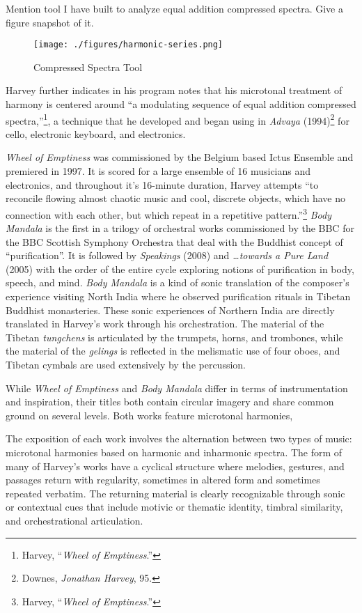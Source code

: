 Mention tool I have built to analyze equal addition compressed spectra. Give a figure snapshot of it.

\begin{figure}[htbp]
\centering
\texttt{[image: ./figures/harmonic-series.png]}
\caption{Compressed Spectra Tool}
\end{figure}

Harvey further indicates in his program notes that his microtonal treatment of harmony is centered around ``a modulating sequence of equal addition compressed spectra,''\footnote{Harvey, ``\emph{Wheel of Emptiness}.'' }, a technique that he developed and began using in \emph{Advaya} (1994)\footnote{Downes, \emph{Jonathan Harvey}, 95. } for cello, electronic keyboard, and electronics.

\emph{Wheel of Emptiness} was commissioned by the Belgium based Ictus Ensemble and premiered in 1997. It is scored for a large ensemble of 16 musicians and electronics, and throughout it's 16-minute duration, Harvey attempts ``to reconcile flowing almost chaotic music and cool, discrete objects, which have no connection with each other, but which repeat in a repetitive pattern.''\footnote{Harvey, ``\emph{Wheel of Emptiness}.'' } \emph{Body Mandala} is the first in a trilogy of orchestral works commissioned by the BBC for the BBC Scottish Symphony Orchestra that deal with the Buddhist concept of ``purification''. It is followed by \emph{Speakings} (2008) and \emph{\ldots{}towards a Pure Land} (2005) with the order of the entire cycle exploring notions of purification in body, speech, and mind. \emph{Body Mandala} is a kind of sonic translation of the composer's experience visiting North India where he observed purification rituals in Tibetan Buddhist monasteries. These sonic experiences of Northern India are directly translated in Harvey's work through his orchestration. The material of the Tibetan \emph{tungchens} is articulated by the trumpets, horns, and trombones, while the material of the \emph{gelings} is reflected in the melismatic use of four oboes, and Tibetan cymbals are used extensively by the percussion.

While \emph{Wheel of Emptiness} and \emph{Body Mandala} differ in terms of instrumentation and inspiration, their titles both contain circular imagery and share common ground on several levels. Both works feature microtonal harmonies,

The exposition of each work involves the alternation between two types of music: microtonal harmonies based on harmonic and inharmonic spectra. The form of many of Harvey's works have a cyclical structure where melodies, gestures, and passages return with regularity, sometimes in altered form and sometimes repeated verbatim. The returning material is clearly recognizable through sonic or contextual cues that include motivic or thematic identity, timbral similarity, and orchestrational articulation.

